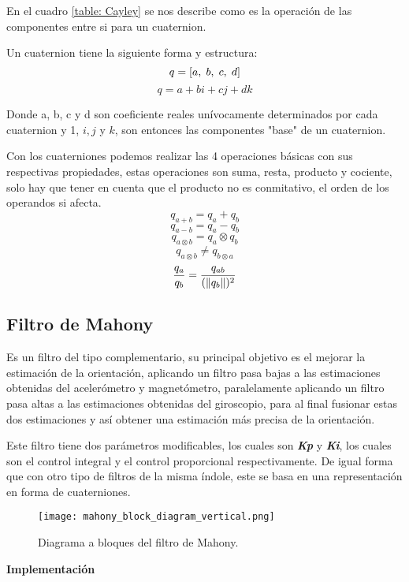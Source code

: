         En el cuadro \ref{table: Cayley} se nos describe como es la operación de las componentes entre si para un cuaternion.

        Un cuaternion tiene la siguiente forma y estructura:
        $$ q = [a, \hspace{1mm} b, \hspace{1mm} c, \hspace{1mm} d]$$
        $$ q = a + bi +cj + dk $$

        Donde a, b, c y d son coeficiente reales unívocamente determinados por cada cuaternion y 
        1, $ i, j $ y $ k $, son entonces las componentes "base" de un cuaternion.

        Con los cuaterniones podemos realizar las 4 operaciones básicas con sus respectivas propiedades, estas operaciones son
        suma, resta, producto y cociente, solo hay que tener en cuenta que el producto no es conmitativo, el orden de los operandos
        si afecta.
        $$  q_{a+b} = q_a + q_b $$
        $$  q_{a-b} = q_a - q_b $$
        $$  q_{a \otimes b} = q_a \otimes q_b $$
        $$  q_{a \otimes b} \neq q_{b \otimes a}  $$
        $$  \frac{q_a}{q_b} = \frac{q_{ab}}{(\lVert q_b\rVert)^2} $$

    \subsection{Filtro de Mahony}
    Es un filtro del tipo complementario, su principal objetivo es el mejorar la estimación de la orientación, aplicando un filtro pasa bajas a las estimaciones obtenidas del acelerómetro y magnetómetro, paralelamente aplicando un filtro pasa altas a las estimaciones obtenidas del giroscopio, para al final fusionar estas dos estimaciones y así obtener una estimación más precisa de la orientación. 
    
    Este filtro tiene dos parámetros modificables, los cuales son \textbf{\textit{Kp}} y \textbf{\textit{Ki}}, los cuales son el control integral y el control proporcional respectivamente. De igual forma que con otro tipo de filtros de la misma índole, este se basa en una representación en forma de cuaterniones.
    \begin{figure}[htp]
        \centering
             \texttt{[image: mahony\_block\_diagram\_vertical.png]}
              \caption{Diagrama a bloques del filtro de Mahony.}
    \end{figure}
    \FloatBarrier 


    \textbf{Implementación}

